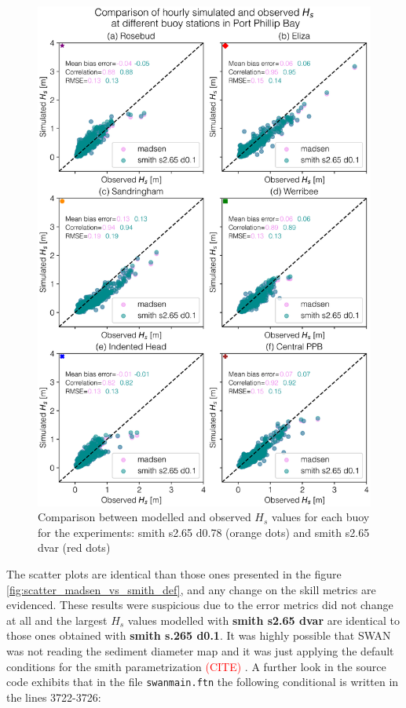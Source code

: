 \documentclass[12pt]{article}
\newcommand{\tocite}{\textcolor{red}{(CITE) }}
\begin{document}
\begin{figure}[h]
    \centering
    \includegraphics[scale=0.7]{plots/scatter/madsen_vs_smith s2.65 d0.1_vert_sca.png}
    \caption{Comparison between modelled and observed $H_{s}$ values for each buoy for the experiments: smith s2.65 d0.78 (orange dots) and smith s2.65 dvar (red dots)}
    \label{fig:scatter_smith_0.78_vs_smith_dvar}
\end{figure}

The scatter plots are identical than those ones presented in the figure \ref{fig:scatter_madsen_vs_smith_def}, and any change on the skill metrics are evidenced. These results were suspicious due to the error metrics did not change at all and the largest $H_s$ values modelled with \textbf{smith s2.65 dvar} are identical to those ones obtained with \textbf{smith s.265 d0.1}. It was highly possible that SWAN was not reading the sediment diameter map and it was just applying the default conditions for the smith parametrization \tocite. A further look in the source code exhibits that in the file \verb|swanmain.ftn| the following conditional is written in the lines 3722-3726:
\end{document}

